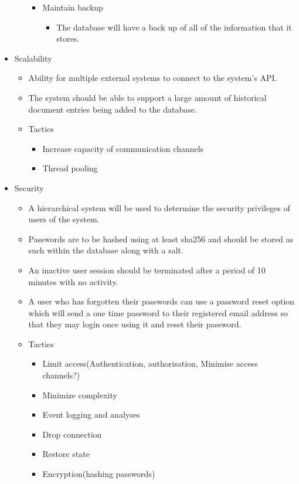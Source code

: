 \documentclass[a4paper,12pt]{article}
\begin{document}
\begin{itemize}
\begin{itemize}
\begin{itemize}
				\item Maintain backup
				
					\begin{itemize}
						\item The database will have a back up of all of the information that it stores.
					\end{itemize}
								

			\end{itemize}
						
		\end{itemize}
		\item Scalability
		\begin{itemize}
			\item Ability for multiple external systems to connect to the system's API.
			\item The system should be able to support a large amount of historical document entries being added to the database.
			
			\item Tactics
			\begin{itemize}

				\item Increase capacity of communication channels
				\item Thread pooling

			\end{itemize}
						
		\end{itemize}
		\item Security
		\begin{itemize}
			\item A hierarchical system will be used to determine the security privileges of users of the system.
			\item Passwords are to be hashed using at least sha256 and should be stored as such within the database along with a salt.
			\item An inactive user session should be terminated after a period of 10 minutes with no activity.
			\item A user who has forgotten their passwords can use a password reset option which will send a one time password to their registered email address so that they may login once using it and reset their password.
			
			\item Tactics
			\begin{itemize}
				\item Limit access(Authentication, authorisation, Minimise access channels?)
				\item Minimize complexity
				\item Event logging and analyses
				\item Drop connection
				\item Restore state
				\item Encryption(hashing passwords)
				

\end{itemize}
\end{itemize}
\end{itemize}
\end{document}
